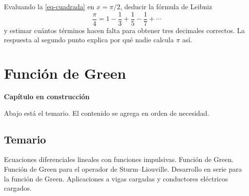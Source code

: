 \documentclass[
  spanish,
  a4paper,
]{scrbook}
\theoremstyle{definition}
\theoremstyle{plain}
\theoremstyle{definition}
\theoremstyle{plain}
\theoremstyle{definition}
\theoremstyle{remark}
\begin{document}
\begin{tcolorbox}[enhanced jigsaw, arc=.35mm, bottomrule=.15mm, bottomtitle=1mm, breakable, colback=white, colbacktitle=quarto-callout-tip-color!10!white, colframe=quarto-callout-tip-color-frame, coltitle=black, left=2mm, leftrule=.75mm, opacityback=0, opacitybacktitle=0.6, rightrule=.15mm, title=\textcolor{quarto-callout-tip-color}{\faLightbulb}\hspace{0.5em}{Para hacer a mano: el valor de \(\pi/4\)}, titlerule=0mm, toprule=.15mm, toptitle=1mm]

Evaluando la \ref{eq-cuadrada} en \(x = \pi/2\), deducir la fórmula de
Leibniz \[
\frac{\pi}{4} = 1 - \frac13 + \frac15 - \frac17 + \cdots
\] y estimar cuántos términos hacen falta para obtener tres decimales
correctos. La respuesta al segundo punto explica por qué nadie calcula
\(\pi\) así.

\end{tcolorbox}

\chapter{Función de Green}\label{sec-green}

\begin{tcolorbox}[enhanced jigsaw, arc=.35mm, bottomrule=.15mm, breakable, colback=white, colframe=quarto-callout-note-color-frame, left=2mm, leftrule=.75mm, opacityback=0, rightrule=.15mm, toprule=.15mm]
\begin{minipage}[t]{5.5mm}
\textcolor{quarto-callout-note-color}{\faInfo}
\end{minipage}%
\begin{minipage}[t]{\textwidth - 5.5mm}

\vspace{-3mm}\textbf{Capítulo en construcción}\vspace{3mm}

Abajo está el temario. El contenido se agrega en orden de necesidad.

\end{minipage}%
\end{tcolorbox}

\section*{Temario}\label{temario-3}


Ecuaciones diferenciales lineales con funciones impulsivas. Función de
Green. Función de Green para el operador de Sturm--Liouville. Desarrollo
en serie para la función de Green. Aplicaciones a vigas cargadas y
conductores eléctricos cargados.
\end{document}
